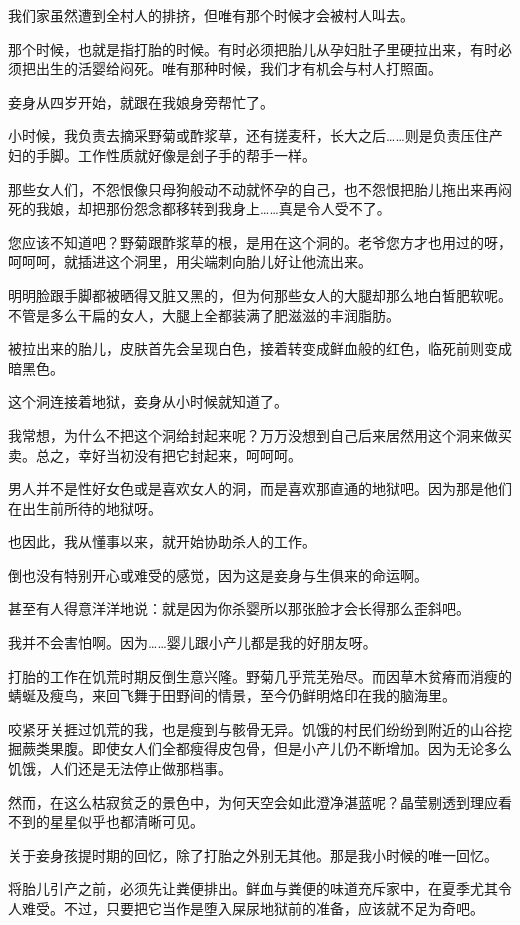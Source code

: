\documentclass[portrait,a4paper]{article}
\begin{document}
我们家虽然遭到全村人的排挤，但唯有那个时候才会被村人叫去。

那个时候，也就是指打胎的时候。有时必须把胎儿从孕妇肚子里硬拉出来，有时必须把出生的活婴给闷死。唯有那种时候，我们才有机会与村人打照面。

妾身从四岁开始，就跟在我娘身旁帮忙了。

小时候，我负责去摘采野菊或酢浆草，还有搓麦秆，长大之后……则是负责压住产妇的手脚。工作性质就好像是刽子手的帮手一样。

那些女人们，不怨恨像只母狗般动不动就怀孕的自己，也不怨恨把胎儿拖出来再闷死的我娘，却把那份怨念都移转到我身上……真是令人受不了。

您应该不知道吧？野菊跟酢浆草的根，是用在这个洞的。老爷您方才也用过的呀，呵呵呵，就插进这个洞里，用尖端刺向胎儿好让他流出来。

明明脸跟手脚都被晒得又脏又黑的，但为何那些女人的大腿却那么地白皙肥软呢。不管是多么干扁的女人，大腿上全都装满了肥滋滋的丰润脂肪。

被拉出来的胎儿，皮肤首先会呈现白色，接着转变成鲜血般的红色，临死前则变成暗黑色。

这个洞连接着地狱，妾身从小时候就知道了。

我常想，为什么不把这个洞给封起来呢？万万没想到自己后来居然用这个洞来做买卖。总之，幸好当初没有把它封起来，呵呵呵。

男人并不是性好女色或是喜欢女人的洞，而是喜欢那直通的地狱吧。因为那是他们在出生前所待的地狱呀。

也因此，我从懂事以来，就开始协助杀人的工作。

倒也没有特别开心或难受的感觉，因为这是妾身与生俱来的命运啊。

甚至有人得意洋洋地说：就是因为你杀婴所以那张脸才会长得那么歪斜吧。

我并不会害怕啊。因为……婴儿跟小产儿都是我的好朋友呀。

打胎的工作在饥荒时期反倒生意兴隆。野菊几乎荒芜殆尽。而因草木贫瘠而消瘦的蜻蜒及瘦鸟，来回飞舞于田野间的情景，至今仍鲜明烙印在我的脑海里。

咬紧牙关捱过饥荒的我，也是瘦到与骸骨无异。饥饿的村民们纷纷到附近的山谷挖掘蕨类果腹。即使女人们全都瘦得皮包骨，但是小产儿仍不断增加。因为无论多么饥饿，人们还是无法停止做那档事。

然而，在这么枯寂贫乏的景色中，为何天空会如此澄净湛蓝呢？晶莹剔透到理应看不到的星星似乎也都清晰可见。

关于妾身孩提时期的回忆，除了打胎之外别无其他。那是我小时候的唯一回忆。

将胎儿引产之前，必须先让粪便排出。鲜血与粪便的味道充斥家中，在夏季尤其令人难受。不过，只要把它当作是堕入屎尿地狱前的准备，应该就不足为奇吧。
\end{document}
